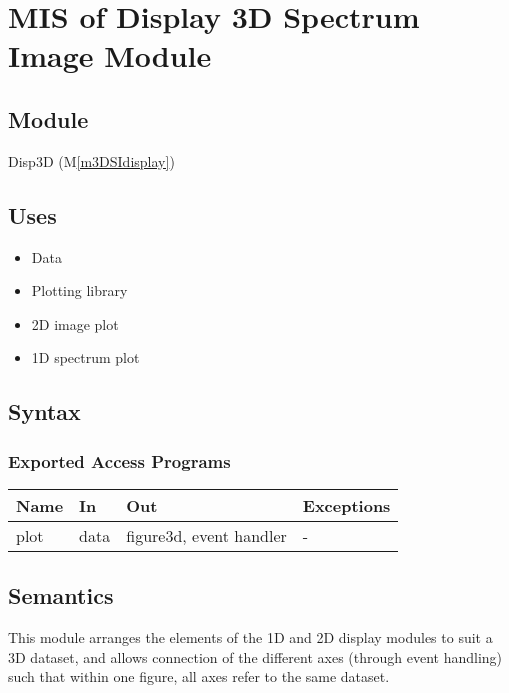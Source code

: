 \documentclass[12pt, titlepage]{article}
\newcommand{\mref}[1]{M\ref{#1}}
\begin{document}
\section{MIS of Display 3D Spectrum Image Module} \label{Mod:Disp3D}

\subsection{Module}

Disp3D (\mref{m3DSIdisplay})

\subsection{Uses}
\begin{itemize}
    \item Data
    \item Plotting library
    \item 2D image plot
    \item 1D spectrum plot
\end{itemize}

\subsection{Syntax}

\subsubsection{Exported Access Programs}

\begin{center}
    \begin{tabular}{p{2cm} p{3cm} p{5cm} p{2cm}}
        \hline
        \textbf{Name} & \textbf{In} & \textbf{Out} & \textbf{Exceptions} \\
        \hline
        plot & data & figure3d, event handler & - \\
        \hline
    \end{tabular}
\end{center}

\subsection{Semantics}
This module arranges the elements of the 1D and 2D display modules to suit a 3D
dataset, and allows connection of the different axes (through event handling)
such that within one figure, all axes refer to the same dataset.
\end{document}
